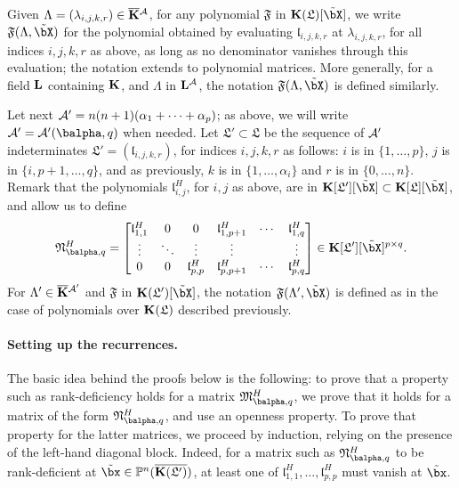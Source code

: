 \documentclass[12pt]{article}
\begin{document}
Given $\Lambda=(\lambda_{i,j,k,r})\in \overline{\mathbf{K}}{}^{\cal A}$, for any polynomial
$\mathfrak{F}$ in $\KK(\mathfrak{L})[\tilde \bX]$, we write
$\mathfrak{F}(\Lambda,\tilde\bX)$ for the polynomial obtained by
evaluating $\mathfrak{l}_{i,j,k,r}$ at $\lambda_{i,j,k,r}$, for all
indices $i,j,k,r$ as above, as long as no denominator vanishes through
this evaluation; the notation extends to polynomial matrices. More
generally, for a field $\mathbf{L}$ containing $\mathbf{K}$, and $\Lambda$ in $\mathbf{L}^{\cal A}$, the
notation $\mathfrak{F}(\Lambda,\tilde\bX)$ is defined similarly.

Let next ${\cal A}'=n(n+1)(\alpha_1+\cdots+\alpha_p)$; as above, 
we will write ${\cal A}'={\cal A}'(\balpha,q)$ when needed. Let
$\mathfrak{L}'\subset \mathfrak{L}$ be the sequence of ${\cal A}'$
indeterminates $\mathfrak{L}'=(\mathfrak{l}_{i,j,k,r})$, for indices
$i,j,k,r$ as follows: $i$ is in $\{1,\dots,p\}$, $j$ is in
$\{i,p+1,\dots,q\}$, and as previously, $k$ is in
$\{1,\dots,\alpha_i\}$ and $r$ is in $\{0,\dots,n\}$. Remark that the
polynomials $\mathfrak{l}^H_{i,j}$, for $i,j$ as above, are in
$\KK[\mathfrak{L}'][\tilde\bX] \subset \KK[\mathfrak{L}][\tilde \bX]$,
and allow us to define
\begin{align}\label{eq:matMprime}
\mathfrak{N}^H_{\balpha,q}=\left [\begin{matrix} \mathfrak{l}^H_{1,1} & 0 & 0
    &\mathfrak{l}^H_{1,p+1} & \cdots & \mathfrak{l}^H_{1,q}\\ \vdots & \ddots &
    \vdots & \vdots & & \vdots\\ 0&0& \mathfrak{l}^H_{p,p}
    &\mathfrak{l}^H_{p,p+1} & \cdots & \mathfrak{l}^H_{p,q}
  \end{matrix}\right ]\in \KK[\mathfrak{L}'][\tilde\bX]^{p\times q}.
\end{align}
For $\Lambda' \in \overline{\mathbf{K}}{}^{{\cal A}'}$ and $\mathfrak{F}$ in 
$\KK(\mathfrak{L}')[\tilde\bX]$, the notation
$\mathfrak{F}(\Lambda',\tilde\bX)$ is defined as in the case of
polynomials over $\mathbf{K}(\mathfrak{L})$ described previously.


\paragraph{Setting up the recurrences.}
The basic idea behind the proofs below is the following: to prove that
a property such as rank-deficiency holds for a matrix $\mathfrak{M}^H_{\balpha,q}$, we prove
that it holds for a matrix of the form $\mathfrak{N}^H_{\balpha,q}$,
and use an openness property. To prove that property for the
latter matrices, we proceed by induction, relying on the presence of
the left-hand diagonal block. Indeed, for a matrix such as
$\mathfrak{N}^H_{\balpha,q}$ to be rank-deficient at $\tilde\bx \in
\P^n(\KKGpbar)$, at least one of
$\mathfrak{l}^H_{1,1},\dots,\mathfrak{l}^H_{p,p}$ must vanish at
$\tilde\bx$.
\end{document}
